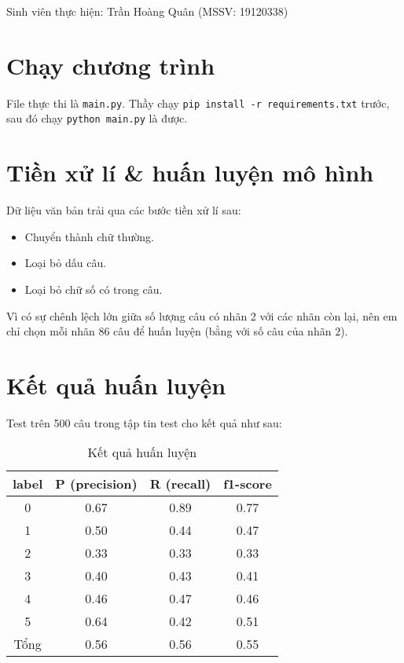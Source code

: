 \documentclass[12pt]{article}
\begin{document}
\noindent Sinh viên thực hiện: Trần Hoàng Quân (MSSV: 19120338)
\section{Chạy chương trình}
File thực thi là \texttt{main.py}. Thầy chạy \texttt{pip install -r requirements.txt} trước, sau đó chạy \texttt{python main.py} là được.
\section{Tiền xử lí \& huấn luyện mô hình}
Dữ liệu văn bản trải qua các bước tiền xử lí sau:
\begin{itemize}
\item Chuyển thành chữ thường.
\item Loại bỏ dấu câu.
\item Loại bỏ chữ số có trong câu.
\end{itemize}
Vì có sự chênh lệch lớn giữa số lượng câu có nhãn 2 với các nhãn còn lại, nên em chỉ chọn mỗi nhãn 86 câu để huấn luyện (bằng với số câu của nhãn 2).

\section{Kết quả huấn luyện}
Test trên 500 câu trong tập tin test cho kết quả như sau:
\begin{table}[H]
\centering
\begin{tabular}{|c|c|c|c|}
\hline
label & P (precision) & R (recall) & f1-score \\
\hline
0 & 0.67 & 0.89 & 0.77 \\
1 & 0.50 & 0.44 & 0.47 \\
2 & 0.33 & 0.33 & 0.33 \\
3 & 0.40 & 0.43 & 0.41 \\
4 & 0.46 & 0.47 & 0.46 \\
5 & 0.64 & 0.42 & 0.51 \\
\hline
Tổng & 0.56 & 0.56 & 0.55 \\
\hline
\end{tabular}
\caption{Kết quả huấn luyện}
\end{table}
\end{document}
